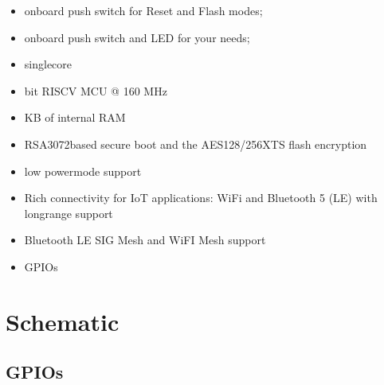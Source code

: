 \documentclass[letterpaper,10pt,english]{sphinxmanual}
\begin{document}
\begin{description}
\begin{itemize}
\item {} 
\sphinxAtStartPar
on\sphinxhyphen{}board push switch for Reset and Flash modes;

\item {} 
\sphinxAtStartPar
on\sphinxhyphen{}board push switch and LED for your needs;

\end{itemize}

\begin{itemize}
\item {} 
\sphinxAtStartPar
single\sphinxhyphen{}core

\item {} 
\sphinxhyphen{}bit RISC\sphinxhyphen{}V MCU @ 160 MHz

\item {} 
 KB of internal RAM

\item {} 
\sphinxAtStartPar
RSA\sphinxhyphen{}3072\sphinxhyphen{}based secure boot and the AES\sphinxhyphen{}128/256\sphinxhyphen{}XTS flash encryption

\item {} 
\sphinxAtStartPar
low power\sphinxhyphen{}mode support

\item {} 
\sphinxAtStartPar
Rich connectivity for IoT applications: Wi\sphinxhyphen{}Fi and Bluetooth 5 (LE) with long\sphinxhyphen{}range support

\item {} 
\sphinxAtStartPar
Bluetooth LE SIG Mesh and Wi\sphinxhyphen{}FI Mesh support

\item {} 
 GPIOs

\end{itemize}

\end{description}

\sphinxstepscope


\chapter{Schematic}
\label{\detokenize{schematic:schematic}}\label{\detokenize{schematic::doc}}

\section{GPIOs}
\label{\detokenize{schematic:gpios}}
\sphinxstepscope
\end{document}
